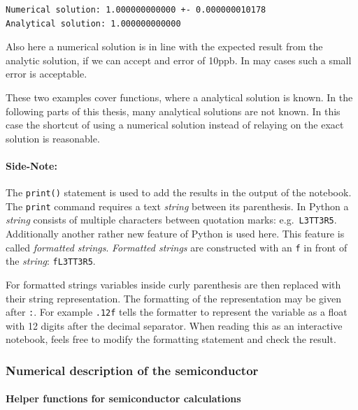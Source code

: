 \documentclass[11pt]{article}
\begin{document}
    \begin{Verbatim}[commandchars=\\\{\}]
Numerical solution: 1.000000000000 +- 0.000000010178
Analytical solution: 1.000000000000
    \end{Verbatim}

    Also here a numerical solution is in line with the expected result from
the analytic solution, if we can accept and error of 10ppb. In may cases
such a small error is acceptable.

These two examples cover functions, where a analytical solution is
known. In the following parts of this thesis, many analytical solutions
are not known. In this case the shortcut of using a numerical solution
instead of relaying on the exact solution is reasonable.

\hypertarget{side-note}{%
\paragraph{Side-Note:}\label{side-note}}

The \texttt{print()} statement is used to add the results in the output
of the notebook. The \texttt{print} command requires a text
\emph{string} between its parenthesis. In Python a \emph{string}
consists of multiple characters between quotation marks:
e.g.~\texttt{\textquotesingle{}L3TT3R5\textquotesingle{}}. Additionally
another rather new feature of Python is used here. This feature is
called \emph{formatted strings}. \emph{Formatted strings} are
constructed with an \texttt{f} in front of the \emph{string}:
\texttt{f\textquotesingle{}L3TT3R5\textquotesingle{}}.

For formatted strings variables inside curly parenthesis are then
replaced with their string representation. The formatting of the
representation may be given after \texttt{:}. For example \texttt{.12f}
tells the formatter to represent the variable as a float with 12 digits
after the decimal separator. When reading this as an interactive
notebook, feels free to modify the formatting statement and check the
result.

    \hypertarget{numerical-description-of-the-semiconductor}{%
\subsubsection{Numerical description of the
semiconductor}\label{numerical-description-of-the-semiconductor}}

    \hypertarget{helper-functions-for-semiconductor-calculations}{%
\paragraph{Helper functions for semiconductor
calculations}\label{helper-functions-for-semiconductor-calculations}}
\end{document}
